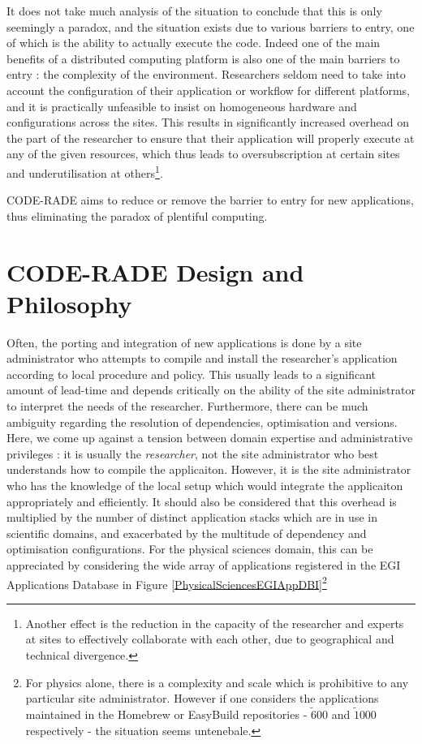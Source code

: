 \documentclass[a4paper]{jpconf}
\begin{document}
	It does not take much analysis of the situation to conclude that this is only seemingly a paradox, and the situation exists due to various barriers to entry, one of which is the ability to actually execute the code. Indeed one of the main benefits of a distributed computing platform is also one of the main barriers to entry : the complexity of the environment. Researchers seldom need to take into account the configuration of their application or workflow for different platforms, and it is practically unfeasible to insist on homogeneous hardware and configurations across the sites. This results in significantly increased overhead on the part of the researcher to ensure that their application will properly execute at any of the given resources, which thus leads to oversubscription at certain sites and underutilisation at others\footnote{Another effect is the reduction in the capacity of the researcher and experts at sites to effectively collaborate with each other, due to geographical and technical divergence.}.

	CODE-RADE aims to reduce or remove the barrier to entry for new applications, thus eliminating the paradox of plentiful computing.

	\section{CODE-RADE Design and Philosophy}

	Often, the porting and integration of new applications is done by a site administrator who attempts to compile and install the researcher's application according to local procedure and policy. This usually leads to a significant amount of lead-time and depends critically on the ability of the site administrator to interpret the needs of the researcher. Furthermore, there can be much ambiguity regarding the resolution of dependencies, optimisation and versions. Here, we come up against a tension between domain expertise and administrative privileges : it is usually the {\it researcher}, not the site administrator who best understands how to compile the applicaiton. However, it is the site administrator who has the knowledge of the local setup which would integrate the applicaiton appropriately and efficiently. It should also be considered that this overhead is multiplied by the number of distinct application stacks which are in use in scientific domains, and exacerbated by the multitude of dependency and optimisation configurations. For the physical sciences domain, this can be appreciated by considering the wide array of applications registered in the EGI Applications Database\cite{EGIAppDB} in Figure \ref{PhysicalSciencesEGIAppDBI}\footnote{For physics alone, there is a complexity and scale which is prohibitive to any particular site administrator. However if one considers the applications maintained in the Homebrew or EasyBuild repositories - $\tilde 600$ and $\tilde 1000$ respectively - the situation seems untenebale.}
\end{document}
